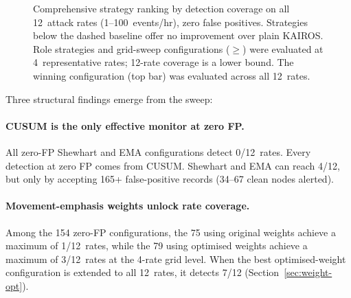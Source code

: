 \documentclass[10pt,twocolumn]{article}
\begin{document}
\begin{figure}[htbp]
\caption{Comprehensive strategy ranking by detection coverage on all
12~attack rates (1--100~events/hr), zero false positives.  Strategies
below the dashed baseline offer no improvement over plain KAIROS.
Role strategies and grid-sweep configurations ($\geq$) were evaluated at
4~representative rates; 12-rate coverage is a lower bound.  The winning
configuration (top bar) was evaluated across all 12~rates.}
\label{fig:grid-bars}
\end{figure}

Three structural findings emerge from the sweep:

\paragraph{CUSUM is the only effective monitor at zero FP.}
All zero-FP Shewhart and EMA configurations detect 0/12~rates.  Every
detection at zero FP comes from CUSUM.  Shewhart and EMA can reach 4/12,
but only by accepting 165+ false-positive records (34--67 clean nodes
alerted).

\paragraph{Movement-emphasis weights unlock rate coverage.}
Among the 154 zero-FP configurations, the 75 using original weights achieve
a maximum of 1/12~rates, while the 79 using optimised weights achieve a
maximum of 3/12~rates at the 4-rate grid level.  When the best optimised-weight
configuration is extended to all 12~rates, it detects 7/12
(Section~\ref{sec:weight-opt}).
\end{document}
